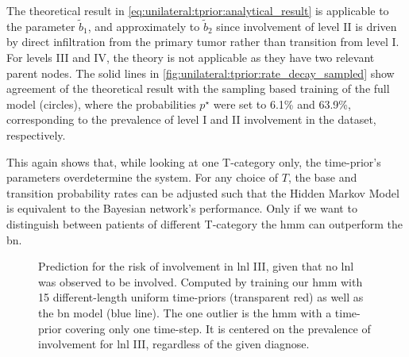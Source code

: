 \documentclass[\relativeRoot/main.tex]{subfiles}
\begin{document}
The theoretical result in \cref{eq:unilateral:tprior:analytical_result} is applicable to the parameter $\tilde{b}_1$, and approximately to $\tilde{b}_2$ since involvement of level II is driven by direct infiltration from the primary tumor rather than transition from level I. For levels III and IV, the theory is not applicable as they have two relevant parent nodes. The solid lines in \cref{fig:unilateral:tprior:rate_decay_sampled} show agreement of the theoretical result with the sampling based training of the full model (circles), where the probabilities $p^{\star}$ were set to 6.1\% and 63.9\%, corresponding to the prevalence of level I and II involvement in the dataset, respectively.

This again shows that, while looking at one T-category only, the time-prior's parameters overdetermine the system. For any choice of $T$, the base and transition probability rates can be adjusted such that the Hidden Markov Model is equivalent to the Bayesian network's performance. Only if we want to distinguish between patients of different T-category the \gls{hmm} can outperform the \gls{bn}.

\begin{figure}
    \centering
    \def\svgwidth{0.7\textwidth}
    
    \caption[A risk prediction for varying lengths of time priors]{Prediction for the risk of involvement in \gls{lnl} III, given that no \gls{lnl} was observed to be involved. Computed by training our \gls{hmm} with 15 different-length uniform time-priors (transparent red) as well as the \gls{bn} model (blue line). The one outlier is the \gls{hmm} with a time-prior covering only one time-step. It is centered on the prevalence of involvement for \gls{lnl} III, regardless of the given diagnose.}
    \label{fig:unilateral:tprior:multi_length_risk}
\end{figure}
\end{document}
